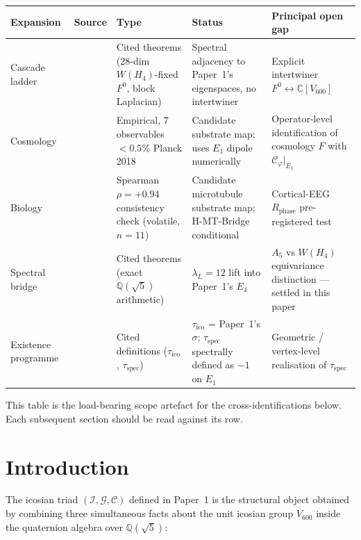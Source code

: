 \documentclass[11pt,a4paper]{article}
\theoremstyle{definition}
\theoremstyle{remark}
\newcommand{\Q}{\mathbb{Q}}
\newcommand{\C}{\mathbb{C}}
\newcommand{\II}{\mathcal{I}}
\newcommand{\GG}{\mathcal{G}}
\newcommand{\CC}{\mathcal{C}}
\newcommand{\WHfour}{W(H_4)}
\begin{document}
\begin{center}\footnotesize
\renewcommand{\arraystretch}{1.25}
\begin{tabular}{|p{}|p{}|p{}|p{}|p{}|}
\hline
\textbf{Expansion} & \textbf{Source} & \textbf{Type} & \textbf{Status} & \textbf{Principal open gap} \\
\hline
Cascade ladder
  & \cite{cascadeRefinementPapers,cascadeSelectionH4}
  & Cited theorems (28-dim $\WHfour$-fixed $F^0$, block Laplacian)
  & Spectral adjacency to Paper~1's eigenspaces, no intertwiner
  & Explicit intertwiner $F^0 \leftrightarrow \C[V_{600}]$ \\
\hline
Cosmology
  & \cite{hypersphereCosmology}
  & Empirical, 7 observables $< 0.5\%$ Planck 2018
  & Candidate substrate map; uses $E_1$ dipole numerically
  & Operator-level identification of cosmology $F$ with $\CC_\varphi|_{E_1}$ \\
\hline
Biology
  & \cite{noteG}
  & Spearman $\rho = +0.94$ consistency check (volatile, $n=11$)
  & Candidate microtubule substrate map; H-MT-Bridge conditional
  & Cortical-EEG $R_{\mathrm{phase}}$ pre-registered test \\
\hline
Spectral bridge
  & \cite{schlafliBridge,spectralBridge24600,bridgeSynthesis}
  & Cited theorems (exact $\Q(\sqrt 5)$ arithmetic)
  & $\lambda_L = 12$ lift into Paper~1's $E_4$
  & $A_5$ vs $\WHfour$ equivariance distinction --- settled in this paper \\
\hline
Existence programme
  & \cite{existenceClosure,lifeAsClosure}
  & Cited definitions ($\tau_{\mathrm{ico}}$, $\tau_{\mathrm{spec}}$)
  & $\tau_{\mathrm{ico}}$ = Paper~1's $\sigma$; $\tau_{\mathrm{spec}}$ spectrally defined as $-1$ on $E_1$
  & Geometric / vertex-level realisation of $\tau_{\mathrm{spec}}$ \\
\hline
\end{tabular}
\end{center}

This table is the load-bearing scope artefact for the cross-identifications
below. Each subsequent section should be read against its row.

\bigskip

\section{Introduction}\label{sec:intro}

The icosian triad $(\II, \GG, \CC)$ defined in Paper~1 is the structural
object obtained by combining three simultaneous facts about the unit
icosian group $V_{600}$ inside the quaternion algebra over $\Q(\sqrt 5)$:
\end{document}
